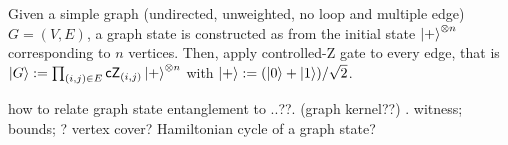 \begin{definition}\label{def:graph_state}
	Given a simple graph (undirected, unweighted, no loop and multiple edge) $G=(V,E)$, a graph state is constructed as 
	from the initial state $\ket{+}^{\otimes n}$ corresponding to $n$ vertices.
	Then, apply controlled-Z gate to every edge, that is 
	$\ket{G}:=\prod_{(i,j)\in E}\textsf{cZ}_{(i,j)} \ket{+}^{\otimes n}$
	with $\ket{+}: = (\ket{0}+\ket{1})/\sqrt{2}$.
\end{definition}
\begin{question}
	how to relate graph state entanglement to 
	..??. (graph kernel??)
	\cite{heinEntanglementGraphStates2006}.
	witness; bounds; ? vertex cover?
	Hamiltonian cycle of a graph state? 
\end{question} 

